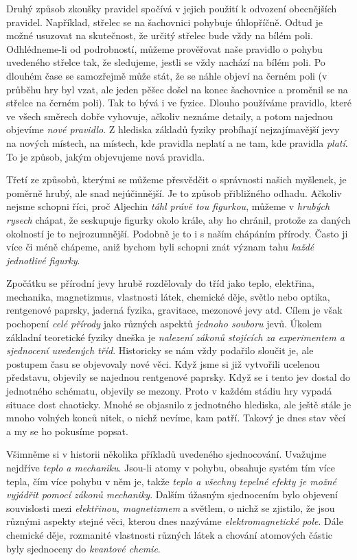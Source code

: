 {    Druhý způsob zkoušky pravidel spočívá v jejich použití k odvození obecnějších pravidel. 
    Například, střelec se na šachovnici pohybuje úhlopříčně. Odtud je možné usuzovat na skutečnost, 
    že určitý střelec bude vždy na bílém poli. Odhlédneme-li od podrobností, můžeme prověřovat naše 
    pravidlo o pohybu uvedeného střelce tak, že sledujeme, jestli se vždy nachází na bílém poli. Po 
    dlouhém čase se samozřejmě může stát, že se náhle objeví na černém poli (v průběhu hry byl 
    vzat, ale jeden pěšec došel na konec šachovnice a proměnil se na střelce na černém poli). Tak 
    to bývá i ve fyzice. Dlouho používáme pravidlo, které ve všech směrech dobře vyhovuje, ačkoliv 
    neznáme detaily, a potom najednou objevíme \emph{nové pravidlo}. Z hlediska základů fyziky 
    probíhají nejzajímavější jevy na nových místech, na místech, kde pravidla neplatí a ne tam, kde 
    pravidla \emph{platí}. To je způsob, jakým objevujeme nová pravidla.
    
    Třetí ze způsobů, kterými se můžeme přesvědčit o správnosti našich myšlenek, je poměrně hrubý, 
    ale snad nejúčinnější. Je to způsob přibližného odhadu. Ačkoliv nejsme schopni říci, proč 
    Aljechin \emph{táhl právě tou figurkou}, můžeme v \emph{hrubých rysech} chápat, že seskupuje 
    figurky okolo krále, aby ho chránil, protože za daných okolností je to nejrozumnější. Podobně 
    je to i s naším chápáním přírody. Často ji více či méně chápeme, aniž bychom byli schopni znát 
    význam tahu \emph{každé jednotlivé figurky}.
    
    Zpočátku se přírodní jevy hrubě rozdělovaly do tříd jako teplo, elektřina, mechanika, 
    magnetizmus, vlastnosti látek, chemické děje, světlo nebo optika, rentgenové paprsky, jaderná 
    fyzika, gravitace, mezonové jevy atd. Cílem je však pochopení \emph{celé přírody} jako různých 
    aspektů \emph{jednoho souboru} jevů. Úkolem základní teoretické fyziky dneška je \emph{nalezení 
    zákonů stojících za experimentem a sjednocení uvedených tříd}. Historicky se nám vždy podařilo 
    sloučit je, ale postupem času se objevovaly nové věci. Když jsme si již vytvořili ucelenou 
    představu, objevily se najednou rentgenové paprsky. Když se i tento jev dostal do jednotného 
    schématu, objevily se mezony. Proto v každém stádiu hry vypadá situace dost chaoticky. Mnohé se 
    objasnilo z jednotného hlediska, ale ještě stále je mnoho volných konců nitek, o nichž nevíme, 
    kam patří. Takový je dnes stav věcí a my se ho pokusíme popsat.
    
    Všimněme si v historii několika příkladů uvedeného sjednocování. Uvažujme nejdříve \emph{teplo 
    a mechaniku}. Jsou-li atomy v pohybu, obsahuje systém tím více tepla, čím více pohybu v něm je, 
    takže \emph{teplo a všechny tepelné efekty je možné vyjádřit pomocí zákonů mechaniky}. Dalším 
    úžasným sjednocením bylo objevení souvislosti mezi \emph{elektřinou, magnetizmem} a světlem, o 
    nichž se zjistilo, že jsou různými aspekty stejné věci, kterou dnes nazýváme 
    \emph{elektromagnetické pole}. Dále chemické děje, rozmanité vlastnosti různých látek a chování 
    atomových částic byly sjednoceny do \emph{kvantové chemie}.
    
}
